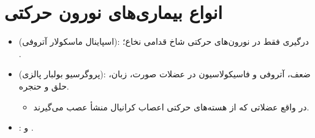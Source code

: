 \documentclass[a4paper,12pt]{extbook}
\begin{document}
\section*{انواع بیماری‌های نورون حرکتی}
\begin{itemize}
\item {} (اسپاینال ماسکولار آتروفی): درگیری فقط در نورون‌های حرکتی شاخ قدامی نخاع؛ .
\item {} (پروگرسیو بولبار پالزی): ضعف، آتروفی و فاسیکولاسیون در عضلات صورت، زبان، حلق و حنجره.
\begin{itemize}
\item در واقع عضلاتی که از هسته‌های حرکتی اعصاب کرانیال منشأ عصب می‌گیرند.
\end{itemize}
\item {}:  و .
\end{itemize}

\end{document}
